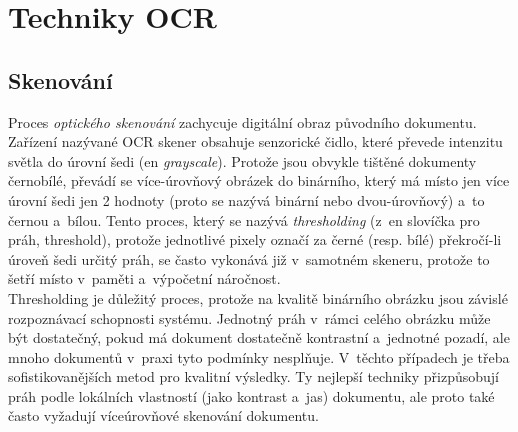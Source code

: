 \documentclass[12pt,oneside]{report}			%
\begin{document}
	\section{Techniky \gls{OCR}}
	\label{sec:OCR-techniky}	
	\subsection{Skenování}
	\label{sec:scan}
	Proces \emph{optického skenování} zachycuje digitální obraz původního dokumentu. Zařízení nazývané OCR skener obsahuje senzorické čidlo, které převede intenzitu světla do úrovní šedi (\gls{en} \emph{grayscale}). Protože jsou obvykle tištěné dokumenty černobílé, převádí se více-úrovňový obrázek do binárního, který má místo jen více úrovní šedi jen 2 hodnoty (proto se nazývá binární nebo dvou-úrovňový) a~to černou a~bílou. Tento proces, který se nazývá \emph{thresholding} (z~\gls{en} slovíčka pro práh, threshold), protože jednotlivé pixely označí za černé (resp. bílé) překročí-li úroveň šedi určitý práh, se často vykonává již v~samotném skeneru, protože to šetří místo v~paměti a~výpočetní náročnost. \parencite[\gls{str} 12]{eikvil-ocr} \\
	Thresholding je důležitý proces, protože na kvalitě binárního obrázku jsou závislé rozpoznávací schopnosti systému. Jednotný práh v~rámci celého obrázku může být dostatečný, pokud má dokument dostatečně kontrastní a~jednotné pozadí, ale mnoho dokumentů v~praxi tyto podmínky nesplňuje. V~těchto případech je třeba sofistikovanějších metod pro kvalitní výsledky. Ty nejlepší techniky přizpůsobují práh podle lokálních vlastností (jako kontrast a~jas) dokumentu, ale proto také často vyžadují víceúrovňové skenování dokumentu. \parencite[\gls{str} 16-17]{chaudhuri2017optical}
\end{document}
